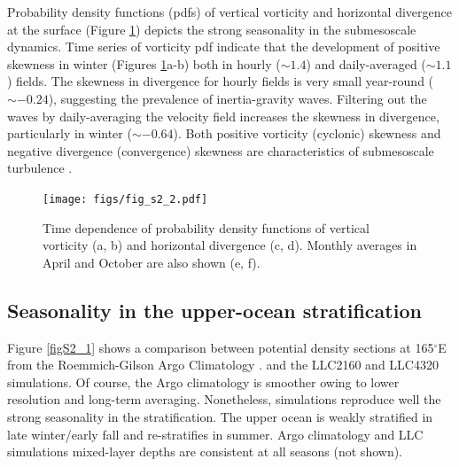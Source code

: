 \documentclass[grl]{agutex2015}
\begin{document}
\begin{article}
Probability density functions (pdfs) of vertical vorticity and horizontal divergence
 at the surface (Figure \ref{figS2_2}) depicts the strong seasonality in the
 submesoscale dynamics. Time series of vorticity pdf indicate that
 the development of positive skewness in winter (Figures \ref{figS2_2}a-b) both in
 hourly ($\sim 1.4$) and daily-averaged ($\sim1.1$) fields. The skewness
 in divergence for hourly fields is very small year-round ($\sim -0.24$), suggesting the
 prevalence of inertia-gravity waves. Filtering out the waves by daily-averaging
 the velocity field increases the skewness in divergence, particularly in winter ($\sim-0.64$). Both
positive vorticity (cyclonic) skewness and negative divergence (convergence) skewness
are characteristics of submesoscale turbulence \citep{mcwilliams2016}.

\begin{figure}[ht]
   \begin{center}
     \texttt{[image: figs/fig\_s2\_2.pdf]}
  \caption{Time dependence of probability density functions of vertical vorticity (a, b)
  and horizontal divergence (c, d). Monthly averages in April and October are
  also shown (e, f).}
  \label{figS2_2}
  \end{center}
\end{figure}

\subsection*{Seasonality in the upper-ocean stratification}

Figure \ref{figS2_1} shows a comparison between potential density sections
at 165$^\circ$E from
the Roemmich-Gilson Argo Climatology \citep[updated from][]{roemmich_gilson2009}.
and the LLC2160 and LLC4320 simulations. Of course, the Argo climatology is smoother
owing to lower resolution and long-term averaging. Nonetheless, simulations reproduce well the strong
seasonality in the stratification. The upper ocean is weakly stratified in late winter/early fall
and re-stratifies in summer. Argo climatology and LLC simulations mixed-layer depths are consistent
at all seasons (not shown).


\end{article}
\end{document}
